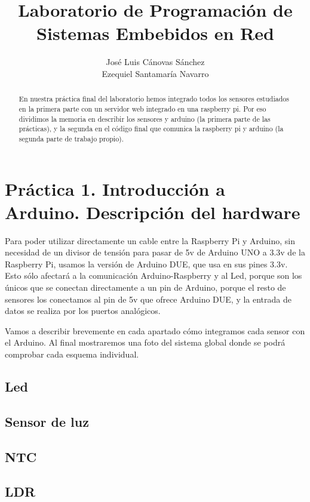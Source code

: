 \documentclass[]{article}
\title{Laboratorio de Programación de Sistemas Embebidos en Red}
\author{José Luis Cánovas Sánchez\\Ezequiel Santamaría Navarro}
\begin{document}
\maketitle


\begin{abstract}
En nuestra práctica final del laboratorio hemos integrado todos los sensores estudiados en la primera parte con un servidor web integrado en una raspberry pi. Por eso dividimos la memoria en describir los sensores y arduino (la primera parte de las prácticas), y la segunda en el código final que comunica la raspberry pi y arduino (la segunda parte de trabajo propio).
\end{abstract}

\tableofcontents

\clearpage

\section{Práctica 1. Introducción a Arduino. Descripción del hardware}
Para poder utilizar directamente un cable entre la Raspberry Pi y Arduino, sin necesidad de un divisor de tensión para pasar de 5v de Arduino UNO a 3.3v de la Raspberry Pi, usamos la versión de Arduino DUE, que usa en sus pines 3.3v. Esto sólo afectará a la comunicación Arduino-Raspberry y al Led, porque son los únicos que se conectan directamente a un pin de Arduino, porque el resto de sensores los conectamos al pin de 5v que ofrece Arduino DUE, y la entrada de datos se realiza por los puertos analógicos.

Vamos a describir brevemente en cada apartado cómo integramos cada sensor con el Arduino. Al final mostraremos una foto del sistema global donde se podrá comprobar cada esquema individual.

\subsection{Led}

\subsection{Sensor de luz}

\subsection{NTC}

\subsection{LDR}
\end{document}
